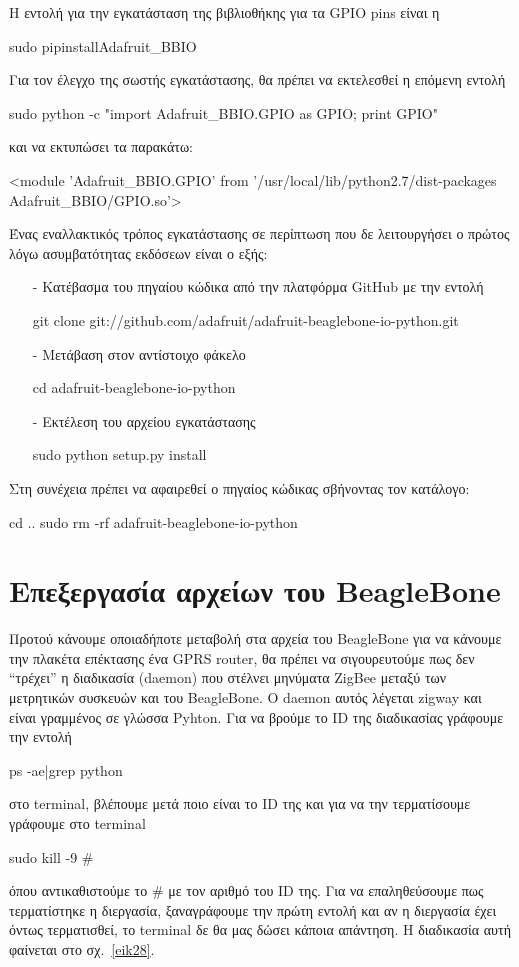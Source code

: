 \documentclass[12pt, a4paper, oneside]{report}
\begin{document}
Η εντολή για την εγκατάσταση της βιβλιοθήκης για τα GPIO pins είναι η
\begin{code}
sudo pipinstallAdafruit_BBIO
\end{code}

Για τον έλεγχο της σωστής εγκατάστασης, θα πρέπει να εκτελεσθεί η επόμενη εντολή
\begin{code}
sudo python -c "import Adafruit_BBIO.GPIO as GPIO; print GPIO"
\end{code}
και να εκτυπώσει τα παρακάτω:
\begin{code}
<module 'Adafruit_BBIO.GPIO' from '/usr/local/lib/python2.7/dist-packages Adafruit_BBIO/GPIO.so'>
\end{code}

Ένας εναλλακτικός τρόπος εγκατάστασης σε περίπτωση που δε λειτουργήσει ο πρώτος λόγω ασυμβατότητας εκδόσεων είναι ο εξής:
\begin{itemize}
\item[-] Κατέβασμα του πηγαίου κώδικα από την πλατφόρμα GitHub με την εντολή \begin{code}
git clone git://github.com/adafruit/adafruit-beaglebone-io-python.git
\end{code}
\item[-] Μετάβαση στον αντίστοιχο φάκελο \begin{code}
cd adafruit-beaglebone-io-python
\end{code}
\item[-] Εκτέλεση του αρχείου εγκατάστασης \begin{code}
sudo python setup.py install
\end{code}
\end{itemize}
Στη συνέχεια πρέπει να αφαιρεθεί ο πηγαίος κώδικας σβήνοντας τον κατάλογο:
\begin{code}
cd ..
sudo rm -rf adafruit-beaglebone-io-python
\end{code}



\section{Επεξεργασία αρχείων του BeagleBone}

Προτού κάνουμε οποιαδήποτε μεταβολή στα αρχεία του BeagleBone για να κάνουμε την πλακέτα επέκτασης ένα GPRS router, θα πρέπει να σιγουρευτούμε πως δεν ``τρέχει'' η διαδικασία (daemon) που στέλνει μηνύματα ZigBee μεταξύ των μετρητικών συσκευών και του BeagleBone. Ο daemon αυτός λέγεται zigway και είναι γραμμένος σε γλώσσα Pyhton. Για να βρούμε το ID της διαδικασίας γράφουμε την εντολή 
\begin{code}
ps -ae|grep python
\end{code}
στο terminal, βλέπουμε μετά ποιο είναι το ID της και για να την τερματίσουμε γράφουμε στο terminal 
\begin{code}
sudo kill -9 #
\end{code}
όπου αντικαθιστούμε το \# με τον αριθμό του ID της. Για να επαληθεύσουμε πως τερματίστηκε η διεργασία, ξαναγράφουμε την πρώτη εντολή και αν η διεργασία έχει όντως τερματισθεί, το terminal δε θα μας δώσει κάποια απάντηση. Η διαδικασία αυτή φαίνεται στο σχ.~\ref{eik28}.
\end{document}

